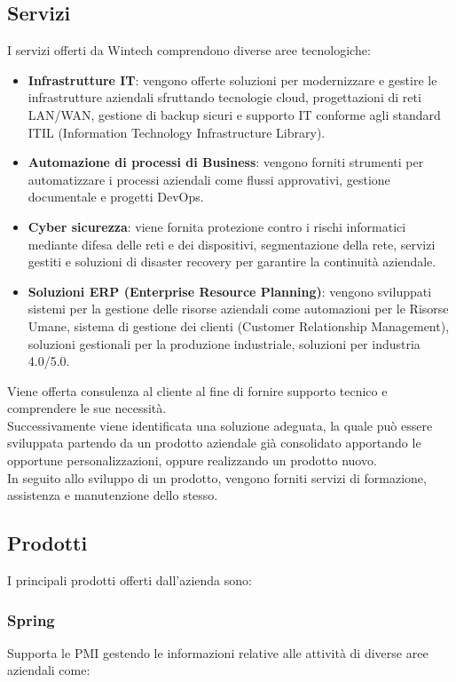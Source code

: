 \subsection{Servizi}
I servizi offerti da Wintech comprendono diverse aree tecnologiche:
\begin{itemize}
	\item \textbf{Infrastrutture IT}: vengono offerte soluzioni per modernizzare e gestire le infrastrutture aziendali sfruttando tecnologie cloud, progettazioni di reti LAN/WAN, gestione di backup sicuri e supporto IT conforme agli standard ITIL (Information Technology Infrastructure Library). 
	\item \textbf{Automazione di processi di Business}: vengono forniti strumenti per automatizzare i processi aziendali come flussi approvativi, gestione documentale e progetti DevOps.
	\item \textbf{Cyber sicurezza}: viene fornita protezione contro i rischi informatici mediante difesa delle reti e dei dispositivi, segmentazione della rete, servizi gestiti e soluzioni di disaster recovery per garantire la continuità aziendale. 
	\item \textbf{Soluzioni ERP (Enterprise Resource Planning)}: vengono sviluppati sistemi per la gestione delle risorse aziendali come automazioni per le Risorse Umane, sistema di gestione dei clienti (Customer Relationship Management), soluzioni gestionali per la produzione industriale, soluzioni per industria 4.0/5.0.\\
\end{itemize}
Viene offerta consulenza al cliente al fine di fornire supporto tecnico e comprendere le sue necessità.\\
Successivamente viene identificata una soluzione adeguata, la quale può essere sviluppata partendo da un prodotto aziendale già consolidato apportando le opportune personalizzazioni, oppure realizzando un prodotto nuovo.\\
In seguito allo sviluppo di un prodotto, vengono forniti servizi di formazione, assistenza e manutenzione dello stesso. 

\subsection{Prodotti}
I principali prodotti offerti dall'azienda sono: 

\subsubsection*{Spring}
Supporta le PMI gestendo le informazioni relative alle attività di diverse aree aziendali come: 

